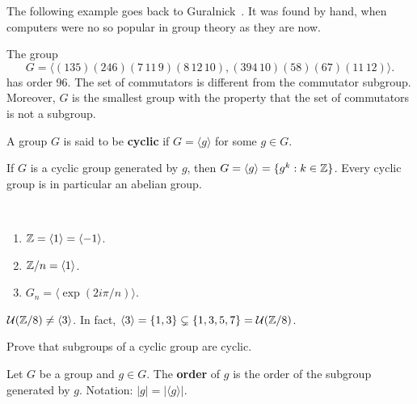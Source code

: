 The following example goes back to Guralnick~\cite{MR673806}. 
It was found by hand, when computers were no so popular
in group theory as they are now. 

\begin{example}
The group 
\[
G=\langle (135)(246)(7\,11\,9)(8\,12\,10),(394\,10)(58)(67)(11\,12)\rangle.
\]
has order 96. The set of commutators 
is different from the commutator subgroup. Moreover, 
$G$ is the smallest group with the property that  
the set of commutators is not a subgroup. 
\end{example}


\begin{definition}
        A group $G$ is said to be \textbf{cyclic} if 
        $G=\langle g\rangle$ for some 
        $g\in G$.
\end{definition}

If $G$ is a cyclic group generated by $g$, then 
$G=\langle g\rangle=\{g^k:k\in\mathbb{Z}\}$. Every cyclic group is
in particular an abelian group. 

\begin{examples}\
\begin{enumerate}
        \item $\mathbb{Z}=\langle 1\rangle=\langle -1\rangle$.
        \item $\mathbb{Z}/n=\langle 1\rangle$.
        \item $G_n=\langle \exp(2i\pi/n)\rangle$.
\end{enumerate}
\end{examples}

\begin{example}
        $\mathcal{U}(\mathbb{Z}/8)\ne\langle 3\rangle$. In fact, $\langle 3\rangle=\{1,3\}\subsetneq\{1,3,5,7\}=\mathcal{U}(\mathbb{Z}/8)$.
\end{example}

\begin{exercise}
\label{xca:subgroups_cyclic}
        Prove that subgroups of a cyclic group are cyclic.
\end{exercise}

\begin{definition}
        Let $G$ be a group and $g\in G$. The \textbf{order} of $g$
        is the order of the subgroup generated by $g$. Notation:
        $|g|=|\langle g\rangle|$.
\end{definition}


